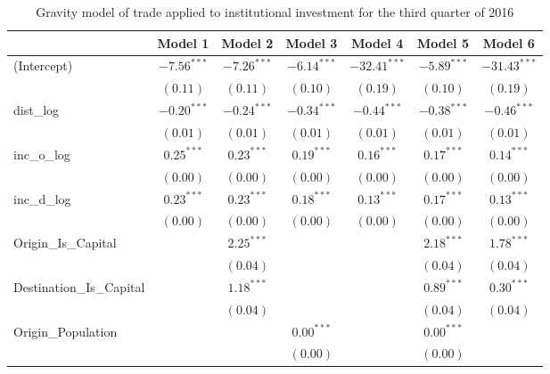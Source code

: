\begin{table}
	\begin{center}
		\small
		\caption[Gravity Model of Trade for Q3 2016]{Gravity model of trade applied to institutional investment for the third quarter of 2016}
		\begin{tabular}{l c c c c c c }
			\hline
			& Model 1 & Model 2 & Model 3 & Model 4 & Model 5 & Model 6 \\
			\hline
			(Intercept)                  & $-7.56^{***}$ & $-7.26^{***}$ & $-6.14^{***}$ & $-32.41^{***}$ & $-5.89^{***}$ & $-31.43^{***}$ \\
			& $(0.11)$      & $(0.11)$      & $(0.10)$      & $(0.19)$       & $(0.10)$      & $(0.19)$       \\
			dist\_log                    & $-0.20^{***}$ & $-0.24^{***}$ & $-0.34^{***}$ & $-0.44^{***}$  & $-0.38^{***}$ & $-0.46^{***}$  \\
			& $(0.01)$      & $(0.01)$      & $(0.01)$      & $(0.01)$       & $(0.01)$      & $(0.01)$       \\
			inc\_o\_log                  & $0.25^{***}$  & $0.23^{***}$  & $0.19^{***}$  & $0.16^{***}$   & $0.17^{***}$  & $0.14^{***}$   \\
			& $(0.00)$      & $(0.00)$      & $(0.00)$      & $(0.00)$       & $(0.00)$      & $(0.00)$       \\
			inc\_d\_log                  & $0.23^{***}$  & $0.23^{***}$  & $0.18^{***}$  & $0.13^{***}$   & $0.17^{***}$  & $0.13^{***}$   \\
			& $(0.00)$      & $(0.00)$      & $(0.00)$      & $(0.00)$       & $(0.00)$      & $(0.00)$       \\
			Origin\_Is\_Capital          &               & $2.25^{***}$  &               &                & $2.18^{***}$  & $1.78^{***}$   \\
			&               & $(0.04)$      &               &                & $(0.04)$      & $(0.04)$       \\
			Destination\_Is\_Capital     &               & $1.18^{***}$  &               &                & $0.89^{***}$  & $0.30^{***}$   \\
			&               & $(0.04)$      &               &                & $(0.04)$      & $(0.04)$       \\
			Origin\_Population           &               &               & $0.00^{***}$  &                & $0.00^{***}$  &                \\
			&               &               & $(0.00)$      &                & $(0.00)$      &                \\

\end{tabular}
\end{center}
\end{table}
